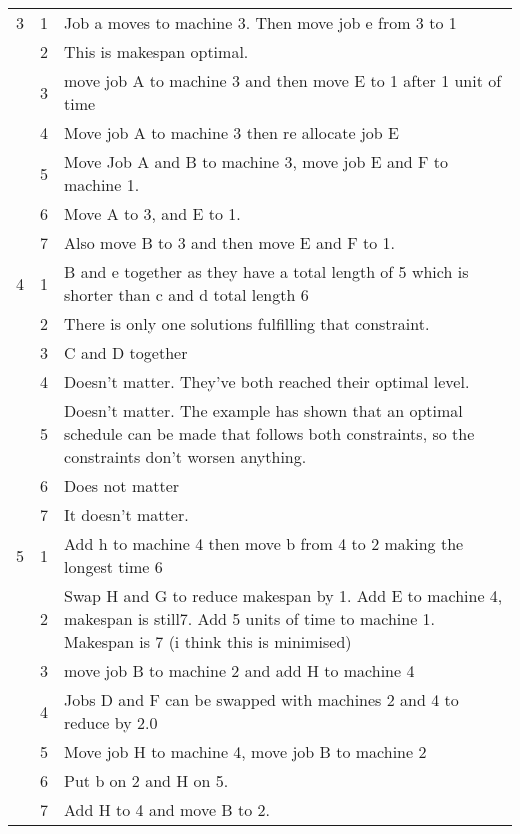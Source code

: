 \begin{tabularx}{\linewidth}{c c X}
	\hline
	3 & 1 & Job a moves to machine 3. Then move job e from 3 to 1 \\
	& 2 & This is makespan optimal. \\
	& 3 & move job A to machine 3 and then move E to 1 after 1 unit of time \\
	& 4 & Move job A to machine 3 then re allocate job E \\
	& 5 & Move Job A and B to machine 3, move job E and F to machine 1. \\
	& 6 & Move A to 3, and E to 1. \\
	& 7 & Also move B to 3 and then move E and F to 1. \\
	\hline
	4 & 1 & B and e together as they have a total length of 5 which is shorter than c and d total length 6 \\
	& 2 & There is only one solutions fulfilling that constraint. \\
	& 3 & C and D together \\
	& 4 & Doesn't matter. They've both reached their optimal level. \\
	& 5 & Doesn't matter. The example has shown that an optimal schedule can be made that follows both constraints, so the constraints don't worsen anything. \\
	& 6 & Does not matter \\
	& 7 & It doesn't matter. \\
	\hline
	5 & 1 & Add h to machine 4 then move b from 4 to 2 making the longest time 6 \\
	& 2 & Swap H and G to reduce makespan by 1. Add E to machine 4, makespan is still7. Add 5 units of time to machine 1. Makespan is 7 (i think this is minimised) \\
	& 3 & move job B to machine 2 and add H to machine 4 \\
	& 4 & Jobs D and F can be swapped with machines 2 and 4 to reduce by 2.0 \\
	& 5 & Move job H to machine 4, move job B to machine 2 \\
	& 6 & Put b on 2 and H on 5. \\
	& 7 & Add H to 4 and move B to 2. \\
	\hline
\end{tabularx}
